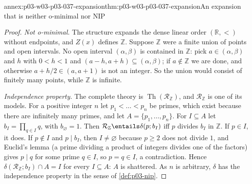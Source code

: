 \begin{annexitem}{annex:p03-w03-p03-037-expansion}{thm:p03-w03-p03-037-expansion}{An expansion that is neither o-minimal nor NIP}
\begin{proof}
\emph{Not o-minimal.}  The structure expands the dense linear order
\((\mathbb R,<)\) without endpoints, and \(Z(x)\) defines \(\mathbb Z\).
Suppose \(\mathbb Z\) were a finite union of points and open intervals.  No
open interval \((\alpha,\beta)\) is contained in \(\mathbb Z\): pick
\(a\in(\alpha,\beta)\) and \(h\) with \(0<h<1\) and
\((a-h,a+h)\subseteq(\alpha,\beta)\); if \(a\notin\mathbb Z\) we are done,
and otherwise \(a+h/2\in(a,a+1)\) is not an integer.  So the union would
consist of finitely many points, while \(\mathbb Z\) is infinite.

\emph{Independence property.}  The complete theory is
\(\operatorname{Th}(\mathcal R_{\mathbb Z})\), and \(\mathcal R_{\mathbb Z}\)
is one of its models.  For a positive integer \(n\) let \(p_1<\dots<p_n\) be
primes, which exist because there are infinitely many primes, and let
\(A=\{p_1,\dots,p_n\}\).  For \(I\subseteq A\) let \(b_I=\prod_{q\in I}q\),
with \(b_\varnothing=1\).  Then \(\mathcal R_{\mathbb Z}\entails\delta(p;b_I)\)
iff \(p\) divides \(b_I\) in \(\mathbb Z\).  If \(p\in I\), it does.  If
\(p\notin I\) and \(p\mid b_I\), then \(I\neq\varnothing\) because \(p\geq2\)
does not divide \(1\), and Euclid's lemma (a prime dividing a product of
integers divides one of the factors) gives \(p\mid q\) for some prime
\(q\in I\), so \(p=q\in I\), a contradiction.  Hence
\(\delta(\mathcal R_{\mathbb Z};b_I)\cap A=I\) for every \(I\subseteq A\):
\(A\) is shattered.  As \(n\) is arbitrary, \(\delta\) has the independence
property in the sense of \cref{def:p03-nip}.
\end{proof}
\end{annexitem}
